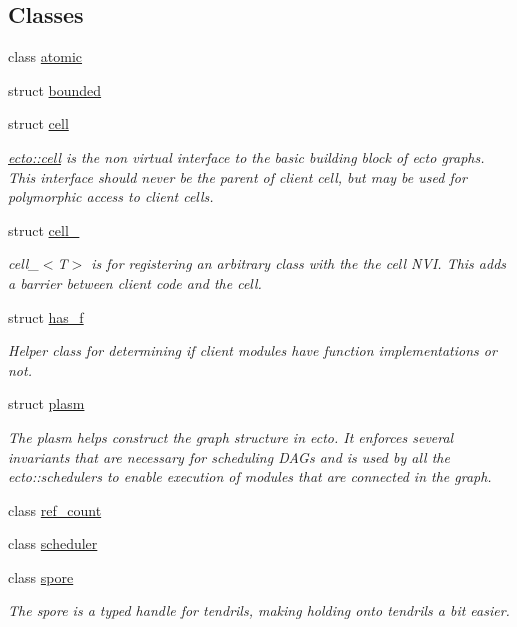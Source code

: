 \subsection*{Classes}
\begin{DoxyCompactItemize}
\item 
class \hyperlink{classecto_1_1atomic}{atomic}
\item 
struct \hyperlink{structecto_1_1bounded}{bounded}
\item 
struct \hyperlink{structecto_1_1cell}{cell}
\begin{DoxyCompactList}\small\item\em \hyperlink{structecto_1_1cell}{ecto\+::cell} is the non virtual interface to the basic building block of ecto graphs. This interface should never be the parent of client cell, but may be used for polymorphic access to client cells. \end{DoxyCompactList}\item 
struct \hyperlink{structecto_1_1cell__}{cell\+\_\+}
\begin{DoxyCompactList}\small\item\em cell\+\_\+$<$\+T$>$ is for registering an arbitrary class with the the cell N\+VI. This adds a barrier between client code and the cell. \end{DoxyCompactList}\item 
struct \hyperlink{structecto_1_1has__f}{has\+\_\+f}
\begin{DoxyCompactList}\small\item\em Helper class for determining if client modules have function implementations or not. \end{DoxyCompactList}\item 
struct \hyperlink{structecto_1_1plasm}{plasm}
\begin{DoxyCompactList}\small\item\em The plasm helps construct the graph structure in ecto. It enforces several invariants that are necessary for scheduling D\+A\+Gs and is used by all the ecto\+::schedulers to enable execution of modules that are connected in the graph. \end{DoxyCompactList}\item 
class \hyperlink{classecto_1_1ref__count}{ref\+\_\+count}
\item 
class \hyperlink{classecto_1_1scheduler}{scheduler}
\item 
class \hyperlink{structecto_1_1spore}{spore}
\begin{DoxyCompactList}\small\item\em The spore is a typed handle for tendrils, making holding onto tendrils a bit easier. \end{DoxyCompactList}\item 

\end{DoxyCompactItemize}
